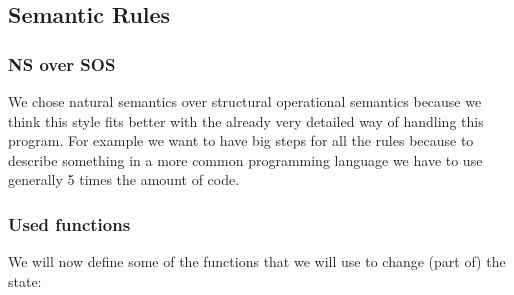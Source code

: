 \documentclass{article}
\begin{document}
\subsection{Semantic Rules}
\subsubsection{NS over SOS}
We chose natural semantics over structural operational semantics because we think this style fits better with the already very detailed way of handling this program. For example we want to have big steps for all the rules because to describe something in a more common programming language we have to use generally 5 times the amount of code.
\subsubsection{Used functions}
We will now define some of the functions that we will use to change (part of) the state:
\end{document}
